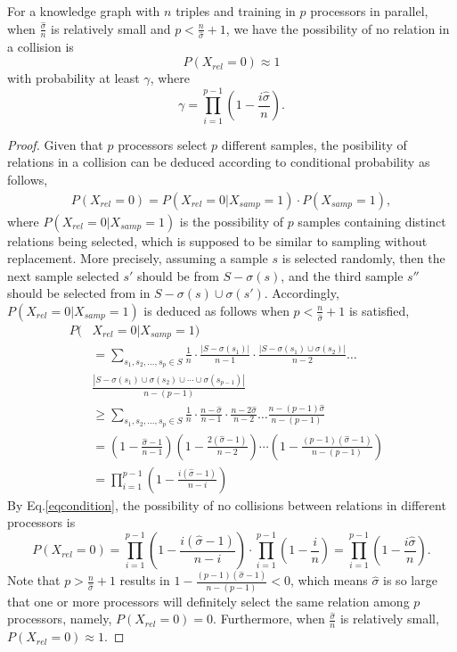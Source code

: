 \documentclass[sigconf]{acmart}
\begin{document}
\begin{theorem}
\label{theorel}
For a knowledge graph with $n$ triples and training in $p$ processors in parallel, 
when $\frac{\hat{\sigma}}{n}$ is relatively small and $p < \frac{n}{\hat{\sigma}}+1$, we have the possibility of no relation in a collision  is 
\begin{equation}
P(X_{rel}=0) \approx 1
\end{equation}
with probability at least $\gamma$, where 
\begin{equation}
\gamma=\prod \limits_{i=1}^{p-1}(1- \frac{i\hat{\sigma}}{n}).
\end{equation}
\end{theorem}
\begin{proof}
Given that $p$ processors select $p$ different samples, the posibility of relations in a collision can be deduced according to conditional probability as follows,  
\begin{align}
\label{eqcondition}
P(X_{rel}=0) = P(X_{rel}=0|X_{samp}=1) \cdot P(X_{samp}=1),
\end{align}
where $P(X_{rel}=0|X_{samp}=1)$ is the possibility of  $p$  samples containing distinct relations being selected, which is supposed to be similar to sampling without replacement. More precisely, assuming a sample $s$ is selected randomly, then the next sample selected $s'$ should be from $S-\sigma(s)$, and the third sample $s''$ should be selected from in $S-\sigma(s) \cup \sigma(s')$. 
Accordingly, $P(X_{rel}=0|X_{samp}=1)$ is deduced as follows when $p < \frac{n}{\hat{\sigma}}+1$ is satisfied, 
\begin{align}
P(&X_{rel}=0|X_{samp}=1) &\nonumber\\
&= \sum_{s_1,s_2,...,s_{p} \in S} \frac{1}{n} \cdot \frac{|S-\sigma(s_1)|}{n-1} \cdot \frac{|S-\sigma(s_1) \cup \sigma(s_2)|}{n-2} \ldots &\nonumber\\
&  \frac{|S-\sigma(s_1) \cup \sigma(s_2) \cup \cdots \cup \sigma(s_{p-1})|}{n-(p-1)}&\nonumber\\
&\geq  \sum_{s_1,s_2,...,s_{p} \in S} \frac{1}{n} \cdot \frac{n-\hat{\sigma}}{n-1} \cdot \frac{n-2\hat{\sigma}}{n-2} \ldots   \frac{n-(p-1)\hat{\sigma}}{n-(p-1)}&\nonumber\\
&=(1-\frac{\hat{\sigma}-1}{n-1})(1-\frac{2(\hat{\sigma}-1)}{n-2})\cdots(1-\frac{(p-1)(\hat{\sigma}-1)}{n-(p-1)}) &\nonumber\\
&= \prod \limits_{i=1}^{p-1}(1- \frac{i(\hat{\sigma}-1)}{n-i})&\nonumber
\end{align}
By Eq.\eqref{eqcondition}, the possibility of no collisions between relations in different processors is 
\begin{equation}
P(X_{rel}=0)=  \prod \limits_{i=1}^{p-1}(1- \frac{i(\hat{\sigma}-1)}{n-i})\cdot \prod \limits_{i=1}^{p-1}(1- \frac{i}{n})=\prod \limits_{i=1}^{p-1}(1- \frac{i\hat{\sigma}}{n}).
\end{equation}
Note that $p>\frac{n}{\hat{\sigma}}+1$ results in $1-\frac{(p-1)(\hat{\sigma}-1)}{n-(p-1)} <0$, which means $\hat{\sigma}$ is so large that one or more processors will definitely select the same relation among $p$ processors, namely, $P(X_{rel}=0) =0$. 
Furthermore, when $\frac{\hat{\sigma}}{n}$ is relatively small, $P(X_{rel}=0) \approx 1$.


\end{proof}
\end{document}
